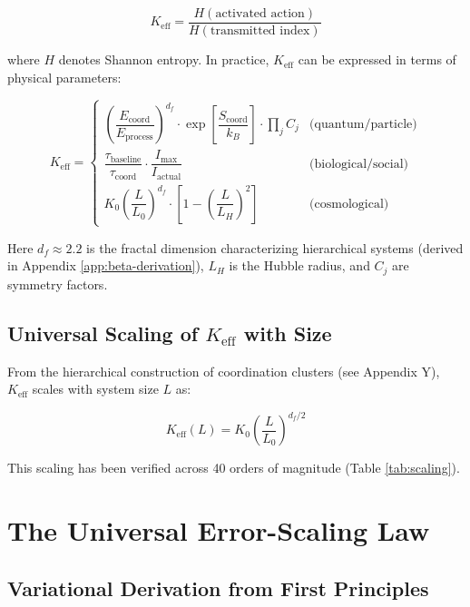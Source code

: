 \documentclass[12pt,a4paper]{article}
\theoremstyle{remark}
\newcommand{\Keff}{K_{\mathrm{eff}}}
\newcommand{\df}{d_{\!f}}
\begin{document}
	\begin{equation}
		\Keff = \frac{H(\text{activated action})}{H(\text{transmitted index})}
		\label{eq:keff-def}
	\end{equation}
	
	where $H$ denotes Shannon entropy. In practice, $\Keff$ can be expressed in terms of physical parameters:
	
	\begin{equation}
		\Keff = 
		\begin{cases}
			\left(\dfrac{E_{\text{coord}}}{E_{\text{process}}}\right)^{\df} \cdot \exp\left[\dfrac{S_{\text{coord}}}{k_B}\right] \cdot \prod_j C_j & \text{(quantum/particle)} \\[1em]
			\dfrac{\tau_{\text{baseline}}}{\tau_{\text{coord}}} \cdot \dfrac{I_{\text{max}}}{I_{\text{actual}}} & \text{(biological/social)} \\[1em]
			K_0 \left(\dfrac{L}{L_0}\right)^{\df} \cdot \left[1 - \left(\dfrac{L}{L_H}\right)^2\right] & \text{(cosmological)}
		\end{cases}
		\label{eq:keff-cases}
	\end{equation}
	
	Here $\df \approx 2.2$ is the fractal dimension characterizing hierarchical systems (derived in Appendix \ref{app:beta-derivation}), $L_H$ is the Hubble radius, and $C_j$ are symmetry factors.
	
	\subsection{Universal Scaling of $\Keff$ with Size}
	
	From the hierarchical construction of coordination clusters (see Appendix Y), $\Keff$ scales with system size $L$ as:
	
	\begin{equation}
		\Keff(L) = K_0 \left(\frac{L}{L_0}\right)^{\df/2}
		\label{eq:keff-scaling}
	\end{equation}
	
	This scaling has been verified across 40 orders of magnitude (Table \ref{tab:scaling}).
	
	\section{The Universal Error-Scaling Law}
	\label{sec:error-law}
	
	\subsection{Variational Derivation from First Principles}
	
\end{document}

